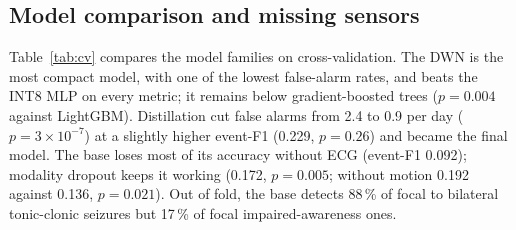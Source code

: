 \documentclass[conference]{IEEEtran}
\begin{document}
\subsection{Model comparison and missing sensors}
Table~\ref{tab:cv} compares the model families on cross-validation. The DWN is the most compact model, with one of
the lowest false-alarm rates, and beats the INT8 MLP on every metric; it remains below gradient-boosted trees
($p = 0.004$ against LightGBM). Distillation cut false alarms from 2.4 to 0.9 per day ($p = 3\times10^{-7}$) at a
slightly higher event-F1 (0.229, $p = 0.26$) and became the final model. The base loses most of its accuracy without
ECG (event-F1 0.092); modality dropout keeps it working (0.172, $p = 0.005$; without motion 0.192 against 0.136,
$p = 0.021$). Out of fold, the base detects 88\,\% of focal to bilateral tonic-clonic seizures but 17\,\% of focal
impaired-awareness ones.

\begin{table}[t]\centering
\caption{Five-fold cross-validation on the 96 training patients (SzCORE, mean over patients; best-F1 operating point;
estimated hardware cost).}\label{tab:cv}
\end{table}
\end{document}
